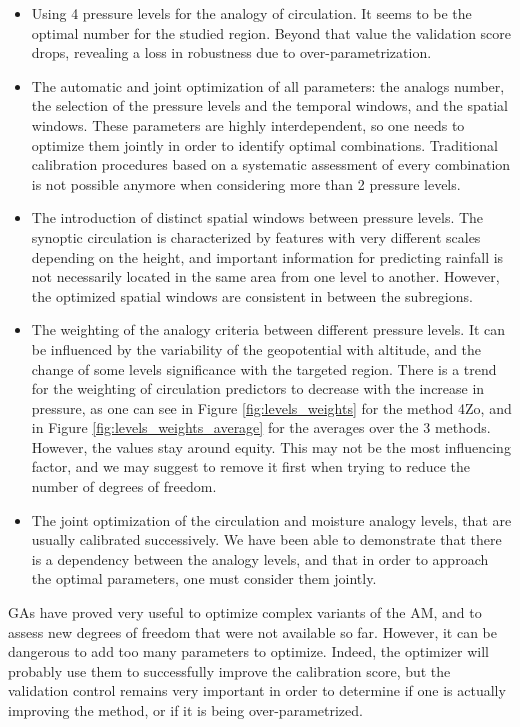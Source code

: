 \documentclass[review]{elsarticle}
\begin{document}
\begin{itemize}
	\item Using 4 pressure levels for the analogy of circulation. It seems to be the optimal number for the studied region. Beyond that value the validation score drops, revealing a loss in robustness due to over-parametrization.
	\item The automatic and joint optimization of all parameters: the analogs number, the selection of the pressure levels and the temporal windows, and the spatial windows. These parameters are highly interdependent, so one needs to optimize them jointly in order to identify optimal combinations. Traditional calibration procedures based on a systematic assessment of every combination is not possible anymore when considering more than 2 pressure levels.
	\item The introduction of distinct spatial windows between pressure levels. The synoptic circulation is characterized by features with very different scales depending on the height, and important information for predicting rainfall is not necessarily located in the same area from one level to another. However, the optimized spatial windows are consistent in between the subregions.
	\item The weighting of the analogy criteria between different pressure levels. It can be influenced by the variability of the geopotential with altitude, and the change of some levels significance with the targeted region. There is a trend for the weighting of circulation predictors to decrease with the increase in pressure, as one can see in Figure \ref{fig:levels_weights} for the method 4Zo, and in Figure \ref{fig:levels_weights_average} for the averages over the 3 methods. However, the values stay around equity. This may not be the most influencing factor, and we may suggest to remove it first when trying to reduce the number of degrees of freedom.
	\item The joint optimization of the circulation and moisture analogy levels, that are usually calibrated successively. We have been able to demonstrate that there is a dependency between the analogy levels, and that in order to approach the optimal parameters, one must consider them jointly.
\end{itemize}


GAs have proved very useful to optimize complex variants of the AM, and to assess new degrees of freedom that were not available so far. However, it can be dangerous to add too many parameters to optimize. Indeed, the optimizer will probably use them to successfully improve the calibration score, but the validation control remains very important in order to determine if one is actually improving the method, or if it is being over-parametrized.
\end{document}
